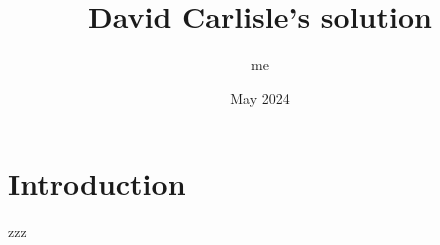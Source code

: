 \documentclass{article}
\title{David Carlisle's solution}
\author{me}
\date{May 2024}
\begin{document}
\maketitle
\section{Introduction}
zzz
\cite{achiam2023gpt}


\end{document}
